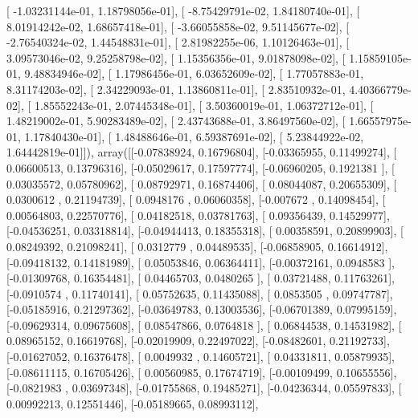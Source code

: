 \documentclass{article}
\begin{document}
       [ -1.03231144e-01,   1.18798056e-01],
       [ -8.75429791e-02,   1.84180740e-01],
       [  8.01914242e-02,   1.68657418e-01],
       [ -3.66055858e-02,   9.51145677e-02],
       [ -2.76540324e-02,   1.44548831e-01],
       [  2.81982255e-06,   1.10126463e-01],
       [  3.09573046e-02,   9.25258798e-02],
       [  1.15356356e-01,   9.01878098e-02],
       [  1.15859105e-01,   9.48834946e-02],
       [  1.17986456e-01,   6.03652609e-02],
       [  1.77057883e-01,   8.31174203e-02],
       [  2.34229093e-01,   1.13860811e-01],
       [  2.83510932e-01,   4.40366779e-02],
       [  1.85552243e-01,   2.07445348e-01],
       [  3.50360019e-01,   1.06372712e-01],
       [  1.48219002e-01,   5.90283489e-02],
       [  2.43743688e-01,   3.86497560e-02],
       [  1.66557975e-01,   1.17840430e-01],
       [  1.48488646e-01,   6.59387691e-02],
       [  5.23844922e-02,   1.64442819e-01]]), array([[-0.07838924,  0.16796804],
       [-0.03365955,  0.11499274],
       [ 0.06600513,  0.13796316],
       [-0.05029617,  0.17597774],
       [-0.06960205,  0.1921381 ],
       [ 0.03035572,  0.05780962],
       [ 0.08792971,  0.16874406],
       [ 0.08044087,  0.20655309],
       [ 0.0300612 ,  0.21194739],
       [ 0.0948176 ,  0.06060358],
       [-0.007672  ,  0.14098454],
       [ 0.00564803,  0.22570776],
       [ 0.04182518,  0.03781763],
       [ 0.09356439,  0.14529977],
       [-0.04536251,  0.03318814],
       [-0.04944413,  0.18355318],
       [ 0.00358591,  0.20899903],
       [ 0.08249392,  0.21098241],
       [ 0.0312779 ,  0.04489535],
       [-0.06858905,  0.16614912],
       [-0.09418132,  0.14181989],
       [ 0.05053846,  0.06364411],
       [-0.00372161,  0.0948583 ],
       [-0.01309768,  0.16354481],
       [ 0.04465703,  0.0480265 ],
       [ 0.03721488,  0.11763261],
       [-0.0910574 ,  0.11740141],
       [ 0.05752635,  0.11435088],
       [ 0.0853505 ,  0.09747787],
       [-0.05185916,  0.21297362],
       [-0.03649783,  0.13003536],
       [-0.06701389,  0.07995159],
       [-0.09629314,  0.09675608],
       [ 0.08547866,  0.0764818 ],
       [ 0.06844538,  0.14531982],
       [ 0.08965152,  0.16619768],
       [-0.02019909,  0.22497022],
       [-0.08482601,  0.21192733],
       [-0.01627052,  0.16376478],
       [ 0.0049932 ,  0.14605721],
       [ 0.04331811,  0.05879935],
       [-0.08611115,  0.16705426],
       [ 0.00560985,  0.17674719],
       [-0.00109499,  0.10655556],
       [-0.0821983 ,  0.03697348],
       [-0.01755868,  0.19485271],
       [-0.04236344,  0.05597833],
       [ 0.00992213,  0.12551446],
       [-0.05189665,  0.08993112],
\end{document}
